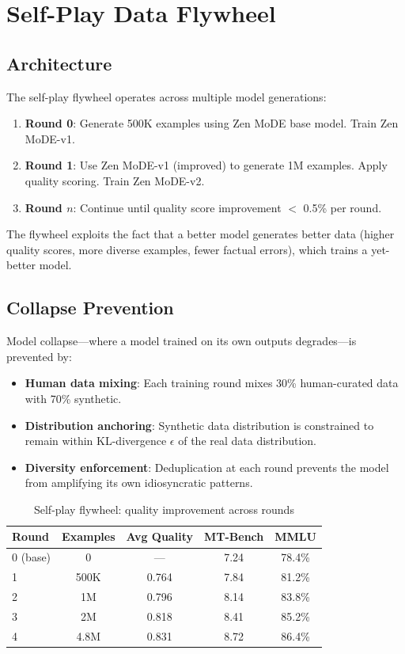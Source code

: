 \documentclass[11pt,a4paper]{article}
\begin{document}
\section{Self-Play Data Flywheel}

\subsection{Architecture}

The self-play flywheel operates across multiple model generations:

\begin{enumerate}
  \item \textbf{Round 0}: Generate 500K examples using Zen MoDE base model. Train Zen MoDE-v1.
  \item \textbf{Round 1}: Use Zen MoDE-v1 (improved) to generate 1M examples. Apply quality scoring. Train Zen MoDE-v2.
  \item \textbf{Round $n$}: Continue until quality score improvement $<$ 0.5\% per round.
\end{enumerate}

The flywheel exploits the fact that a better model generates better data (higher quality scores, more diverse examples, fewer factual errors), which trains a yet-better model.

\subsection{Collapse Prevention}

Model collapse—where a model trained on its own outputs degrades—is prevented by:
\begin{itemize}
  \item \textbf{Human data mixing}: Each training round mixes 30\% human-curated data with 70\% synthetic.
  \item \textbf{Distribution anchoring}: Synthetic data distribution is constrained to remain within KL-divergence $\epsilon$ of the real data distribution.
  \item \textbf{Diversity enforcement}: Deduplication at each round prevents the model from amplifying its own idiosyncratic patterns.
\end{itemize}

\begin{table}[H]
\centering
\caption{Self-play flywheel: quality improvement across rounds}
\label{tab:flywheel}
\begin{tabular}{lcccc}
\toprule
Round & Examples & Avg Quality & MT-Bench & MMLU \\
\midrule
0 (base) & 0 & — & 7.24 & 78.4\% \\
1 & 500K & 0.764 & 7.84 & 81.2\% \\
2 & 1M & 0.796 & 8.14 & 83.8\% \\
3 & 2M & 0.818 & 8.41 & 85.2\% \\
4 & 4.8M & 0.831 & 8.72 & 86.4\% \\
\bottomrule
\end{tabular}
\end{table}
\end{document}
